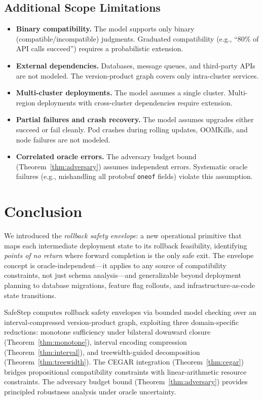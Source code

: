 \documentclass[10pt,twocolumn]{article}
\begin{document}
\subsection{Additional Scope Limitations}
\label{sec:limit-scope}

\begin{itemize}
\item \textbf{Binary compatibility.} The model supports only binary (compatible/incompatible) judgments. Graduated compatibility (e.g., ``80\% of API calls succeed'') requires a probabilistic extension.
\item \textbf{External dependencies.} Databases, message queues, and third-party APIs are not modeled. The version-product graph covers only intra-cluster services.
\item \textbf{Multi-cluster deployments.} The model assumes a single cluster. Multi-region deployments with cross-cluster dependencies require extension.
\item \textbf{Partial failures and crash recovery.} The model assumes upgrades either succeed or fail cleanly. Pod crashes during rolling updates, OOMKills, and node failures are not modeled.
\item \textbf{Correlated oracle errors.} The adversary budget bound (Theorem~\ref{thm:adversary}) assumes independent errors. Systematic oracle failures (e.g., mishandling all protobuf \texttt{oneof} fields) violate this assumption.
\end{itemize}

\section{Conclusion}
\label{sec:conclusion}

We introduced the \emph{rollback safety envelope}: a new operational primitive that maps each intermediate deployment state to its rollback feasibility, identifying \emph{points of no return} where forward completion is the only safe exit. The envelope concept is oracle-independent---it applies to any source of compatibility constraints, not just schema analysis---and generalizable beyond deployment planning to database migrations, feature flag rollouts, and infrastructure-as-code state transitions.

SafeStep computes rollback safety envelopes via bounded model checking over an interval-compressed version-product graph, exploiting three domain-specific reductions: monotone sufficiency under bilateral downward closure (Theorem~\ref{thm:monotone}), interval encoding compression (Theorem~\ref{thm:interval}), and treewidth-guided decomposition (Theorem~\ref{thm:treewidth}). The CEGAR integration (Theorem~\ref{thm:cegar}) bridges propositional compatibility constraints with linear-arithmetic resource constraints. The adversary budget bound (Theorem~\ref{thm:adversary}) provides principled robustness analysis under oracle uncertainty.
\end{document}
